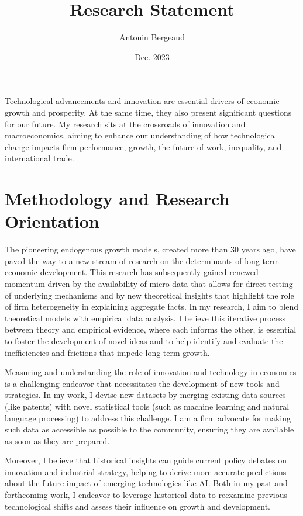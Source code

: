 \documentclass[12pt]{article}
\begin{document}
\title{\textbf{Research Statement}}
\author{Antonin Bergeaud}
\date{Dec. 2023}

\maketitle

Technological advancements and innovation are essential drivers of economic growth and prosperity. At the same time, they also present significant questions for our future. My research sits at the crossroads of innovation and macroeconomics, aiming to enhance our understanding of how technological change impacts firm performance, growth, the future of work, inequality, and international trade.

\section*{Methodology and Research Orientation}

The pioneering endogenous growth models, created more than 30 years ago, have paved the way to a new stream of research on the determinants of long-term economic development. This research has subsequently gained renewed momentum driven by the availability of micro-data that allows for direct testing of underlying mechanisms and by new theoretical insights that highlight the role of firm heterogeneity in explaining aggregate facts. In my research, I aim to blend theoretical models with empirical data analysis. I believe this iterative process between theory and empirical evidence, where each informs the other, is essential to foster the development of novel ideas and to help identify and evaluate the inefficiencies and frictions that impede long-term growth.

Measuring and understanding the role of innovation and technology in economics is a challenging endeavor that necessitates the development of new tools and strategies. In my work, I devise new datasets by merging existing data sources (like patents) with novel statistical tools (such as machine learning and natural language processing) to address this challenge. I am a firm advocate for making such data as accessible as possible to the community, ensuring they are available as soon as they are prepared.

Moreover, I believe that historical insights can guide current policy debates on innovation and industrial strategy, helping to derive more accurate predictions about the future impact of emerging technologies like AI. Both in my past and forthcoming work, I endeavor to leverage historical data to reexamine previous technological shifts and assess their influence on growth and development. 
\end{document}
